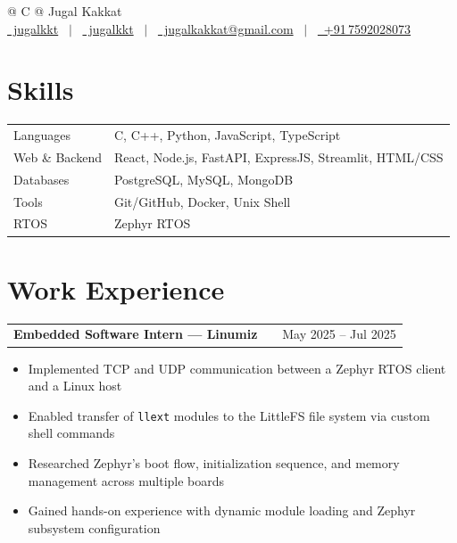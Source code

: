 \documentclass[a4paper,11pt]{article}  %
\makeatletter
\newenvironment{joblong}[2]
    {
    \begin{tabularx}{\linewidth}{@{}l X r@{}}
    \textbf{#1} & \hfill & #2 \\[3.75pt]
    \end{tabularx}
    \begin{minipage}[t]{\linewidth}
    \begin{itemize}[nosep,after=\strut, leftmargin=1em, itemsep=3pt,label=--]
    }
    {
    \end{itemize}
    \end{minipage}
    }
\makeatother
\begin{document}
\pagestyle{empty}

\begin{tabularx}{\linewidth}{@{} C @{}}
\Huge{Jugal Kakkat} \\[7.5pt]
\href{https://github.com/jugalkkt}{\raisebox{-0.05\height}\faGithub\ jugalkkt} \ $|$ \
\href{https://linkedin.com/in/jugalkkt}{\raisebox{-0.05\height}\faLinkedin\ jugalkkt} \ $|$ \
\href{mailto:jugalkakkat@gmail.com}{\raisebox{-0.05\height}\faEnvelope\ jugalkakkat@gmail.com} \ $|$ \
\href{tel:+917592028073}{\raisebox{-0.05\height}\faMobile\ +91\,7592028073}\\
\end{tabularx}

\section{Skills}
\begin{tabularx}{\linewidth}{@{}l X@{}}
Languages       & \normalsize{C, C++, Python, JavaScript, TypeScript} \\
Web \& Backend  & \normalsize{React, Node.js, FastAPI, ExpressJS, Streamlit, HTML/CSS} \\
Databases       & \normalsize{PostgreSQL, MySQL, MongoDB} \\
Tools           & \normalsize{Git/GitHub, Docker, Unix Shell} \\
RTOS            & \normalsize{Zephyr RTOS} \\
\end{tabularx}

\section{Work Experience}

\begin{joblong}{Embedded Software Intern — Linumiz}{May 2025 -- Jul 2025}
    \item Implemented TCP and UDP communication between a Zephyr RTOS client and a Linux host
    \item Enabled transfer of \texttt{llext} modules to the LittleFS file system via custom shell commands
    \item Researched Zephyr's boot flow, initialization sequence, and memory management across multiple boards
    \item Gained hands-on experience with dynamic module loading and Zephyr subsystem configuration
\end{joblong}
\end{document}
